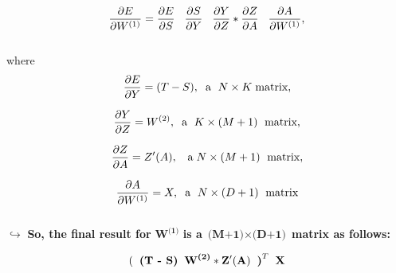 \documentclass[11pt]{article}
\begin{document}
\begin{equation} \frac{\partial E}{\partial W^{(1)}} = \frac{\partial E}{\partial S} \hspace{3mm}  \frac{\partial S}{\partial Y} \hspace{3mm} \frac{\partial Y}{\partial Z} * \frac{\partial Z}{\partial A} \hspace{3mm}  \frac{\partial A}{\partial W^{(1)}},   \end{equation} \\

\noindent where \begin{equation} \frac{\partial E}{\partial Y}  = (T - S), \hspace{2mm} \text{a }\hspace{1mm}N \times K\hspace{1mm}\text{matrix}\text{,}\end{equation}

\begin{equation} \frac{\partial Y}{\partial Z} = W^{(2)}, \hspace{2mm}\text{a }\hspace{1mm} K \times 
(M+1)\hspace{1mm}\text{ matrix}\text{,} \end{equation} 

\begin{equation} \frac{\partial Z}{\partial A} = Z'(A),\hspace{2mm}\text{ a}\hspace{1mm} N\times (M+1)\hspace{1mm}\text{ matrix}\text{,} \end{equation}

\begin{equation} \frac{\partial A}{\partial W^{(1)}} = X, \hspace{2mm}\text{a }\hspace{1mm} N \times (D+1)\hspace{1mm}\text{ matrix}  \end{equation} \\

\noindent $ \hookrightarrow $  \textbf{So, the final result for} $ \textbf{W}^{\textbf{(1)}}$ \textbf{ is a}
$\textbf{(M+1)} \times \textbf{(D+1)}$ \textbf{matrix as follows:}

$$ 
\mathbf{(}\hspace{2mm}\textbf{(T - S)}\hspace{2mm} \textbf{W}^{\textbf{(2)}} * \mathbf{Z'(A)}\hspace{2mm}\textbf{)}^{T}  \hspace{2mm} \mathbf{X} $$ 
\end{document}
